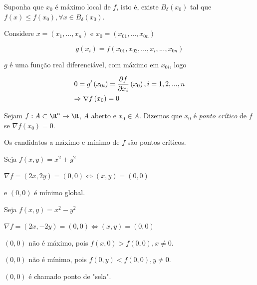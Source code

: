 \documentclass{book}
\begin{document}
\begin{dem}
    Suponha que $x_0$ \'e m\'aximo local de $f$, isto \'e, existe $B_\delta  \left( {x_0 } \right)$ tal que $f\left( x \right) \leqslant f\left( {x_0 } \right),\forall x \in B_\delta  \left( {x_0 } \right)$.

    Considere $x = \left( {x_1 ,...,x_n } \right)$ e $x_0  = \left( {x_{01} ,...,x_{0n} } \right)$

\[
    g\left( {x_i } \right) = f\left( {x_{01} ,x_{02} ,...,x_i ,...,x_{0n} } \right)
\]

$g$ \'e uma fun\c c\~ao real diferenci\'avel, com m\'aximo em $x_{0i}$, logo

\[
\begin{gathered}
0 = g'\left( {x_{0i} } \right) = \frac{{\partial f}}
{{\partial x_i }}\left( {x_0 } \right),i = 1,2,...,n \hfill \\
\Rightarrow \nabla f\left( {x_0 } \right) = 0 \hfill \\
\end{gathered}
\]

\end{dem}

\begin{defn}
    Sejam $f:A \subset \R^n \to \R$, $A$ aberto e $x_0 \in A$. Dizemos que $x_0$ \'e \textit{ponto cr\'itico} de $f$ se $\nabla f\left( {x_0 } \right) = 0$.

Os candidatos a m\'aximo e m\'inimo de $f$ s\~ao pontos cr\'iticos.
\end{defn}

\begin{ex}
Seja $f\left( {x,y} \right) = x^2  + y^2$
\end{ex}

\begin{sol}
    $\nabla f = \left( {2x,2y} \right) = \left( {0,0} \right) \Leftrightarrow \left( {x,y} \right) = \left( {0,0} \right)$

e $\left( {0,0} \right)$ \'e m\'inimo global.
\end{sol}

\begin{ex}
Seja $f\left( {x,y} \right) = x^2  - y^2$
\end{ex}

\begin{sol}
    $\nabla f = \left( {2x, - 2y} \right) = \left( {0,0} \right) \Leftrightarrow \left( {x,y} \right) = \left( {0,0} \right)$

    $\left( {0,0} \right)$ n\~ao \'e m\'aximo, pois $f\left( {x,0} \right) > f\left( {0,0} \right),x \ne 0$.

    $\left( {0,0} \right)$ n\~ao \'e m\'inimo, pois $f\left( {0,y} \right) < f\left( {0,0} \right),y \ne 0$.

$\left( {0,0} \right)$ \'e chamado ponto de "sela".
\end{sol}
\end{document}
